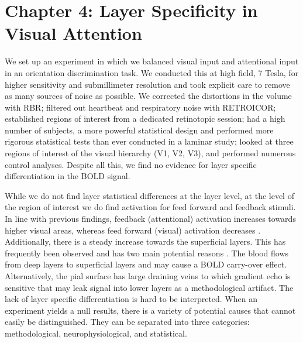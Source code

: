 \section*{Chapter 4: Layer Specificity in Visual Attention}
We set up an experiment in which we balanced visual input and attentional input in an orientation discrimination task. We conducted this at high field, 7 Tesla, for higher sensitivity and submillimeter resolution and took explicit care to remove as many sources of noise as possible. We corrected the distortions in the volume with RBR; filtered out heartbeat and respiratory noise with RETROICOR; established regions of interest from a dedicated retinotopic session; had a high number of subjects, a more powerful statistical design and performed more rigorous statistical tests than ever conducted in a laminar study; looked at three regions of interest of the visual hierarchy (V1, V2, V3), and performed numerous control analyses. Despite all this, we find no evidence for layer specific differentiation in the BOLD signal.

While we do not find layer statistical differences at the layer level, at the level of the region of interest we do find activation for feed forward and feedback stimuli. In line with previous findings, feedback (attentional) activation increases towards higher visual areas, whereas feed forward (visual) activation decreases \cite{Murray2008,Jehee2011}. Additionally, there is a steady increase towards the superficial layers. This has frequently been observed and has two main potential reasons \cite{Koopmans2010,Polimeni2010}. The blood flows from deep layers to superficial layers and may cause a BOLD carry-over effect. Alternatively, the pial surface has large draining veins to which gradient echo is sensitive that may leak signal into lower layers as a methodological artifact. The lack of layer specific differentiation is hard to be interpreted. When an experiment yields a null results, there is a variety of potential causes that cannot easily be distinguished. They can be separated into three categories: methodological, neurophysiological, and statistical. 

